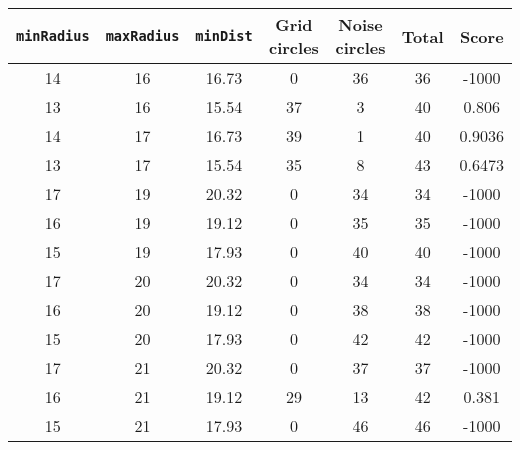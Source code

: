 \documentclass[letterpaper, 12pt]{article}
\begin{document}
\begin{longtable}{|c|c|c|c|c|c|c|}
\hline
\textbf{\texttt{minRadius}} & \textbf{\texttt{maxRadius}} & \textbf{\texttt{minDist}} & \textbf{Grid circles} & \textbf{Noise circles} & \textbf{Total} & \textbf{Score} \\
\hline
14 & 16 & 16.73 & 0 & 36 & 36 & -1000 \\
\hline
13 & 16 & 15.54 & 37 & 3 & 40 & 0.806 \\
\hline
14 & 17 & 16.73 & 39 & 1 & 40 & 0.9036 \\
\hline
13 & 17 & 15.54 & 35 & 8 & 43 & 0.6473 \\
\hline
17 & 19 & 20.32 & 0 & 34 & 34 & -1000 \\
\hline
16 & 19 & 19.12 & 0 & 35 & 35 & -1000 \\
\hline
15 & 19 & 17.93 & 0 & 40 & 40 & -1000 \\
\hline
17 & 20 & 20.32 & 0 & 34 & 34 & -1000 \\
\hline
16 & 20 & 19.12 & 0 & 38 & 38 & -1000 \\
\hline
15 & 20 & 17.93 & 0 & 42 & 42 & -1000 \\
\hline
17 & 21 & 20.32 & 0 & 37 & 37 & -1000 \\
\hline
16 & 21 & 19.12 & 29 & 13 & 42 & 0.381 \\
\hline
15 & 21 & 17.93 & 0 & 46 & 46 & -1000 \\
\hline
\end{longtable}
\end{document}
